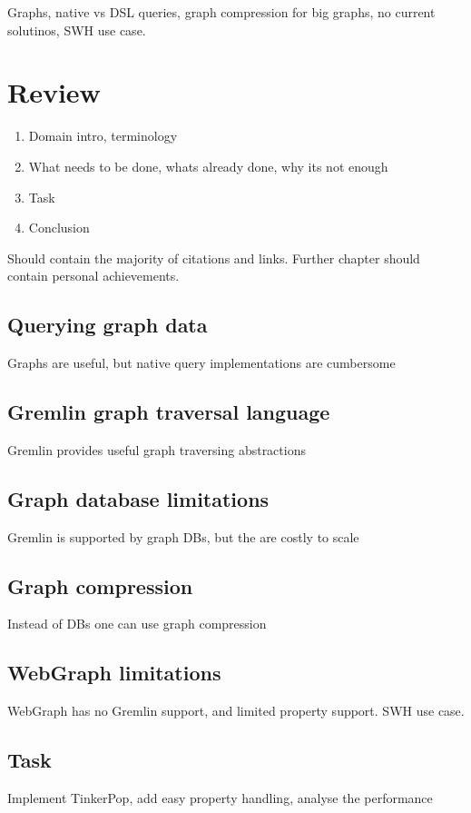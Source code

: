 \documentclass[times,specification,annotation,languages={russian,english}]{itmo-student-thesis}
\begin{document}
\tableofcontents

\startprefacepage
Graphs, native vs DSL queries, graph compression for big graphs, no current solutinos, SWH use case.

\chapter{Review}
\begin{enumerate}
    \item Domain intro, terminology
    \item What needs to be done, whats already done, why its not enough
    \item Task
    \item Conclusion
\end{enumerate}
Should contain the majority of citations and links. Further chapter should contain personal achievements.

\section{Querying graph data}
Graphs are useful, but native query implementations are cumbersome

\section{Gremlin graph traversal language}
Gremlin provides useful graph traversing abstractions

\section{Graph database limitations}
Gremlin is supported by graph DBs, but the are costly to scale

\section{Graph compression}
Instead of DBs one can use graph compression

\section{WebGraph limitations}
WebGraph has no Gremlin support, and limited property support. SWH use case.

\section{Task}\label{sec:task}
Implement TinkerPop, add easy property handling, analyse the performance
\end{document}
